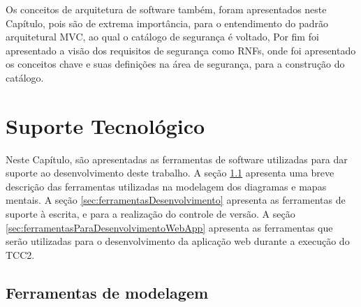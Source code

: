 Os conceitos de arquitetura de software também, foram apresentados neste Capítulo, pois são de extrema importância, para o entendimento do padrão arquitetural MVC, ao qual o catálogo de segurança é voltado, Por fim foi apresentado a visão dos requisitos de segurança como RNFs, onde foi apresentado os conceitos chave e suas definições na área de segurança, para a construção do catálogo. 



\chapter{Suporte Tecnológico}
\label{chap:suporteTecnologico}

Neste Capítulo, são apresentadas as ferramentas de software utilizadas para dar suporte ao desenvolvimento deste trabalho. A seção \ref{sec:ferramentasModelagem} apresenta uma breve descrição das ferramentas utilizadas na modelagem dos diagramas e mapas mentais. A seção \ref{sec:ferramentasDesenvolvimento} apresenta as ferramentas de suporte à escrita, e para a realização do controle de versão. A seção \ref{sec:ferramentasParaDesenvolvimentoWebApp} apresenta as ferramentas que serão utilizadas para o desenvolvimento da aplicação web durante a execução do TCC2.  

\section{Ferramentas de modelagem}
\label{sec:ferramentasModelagem}

